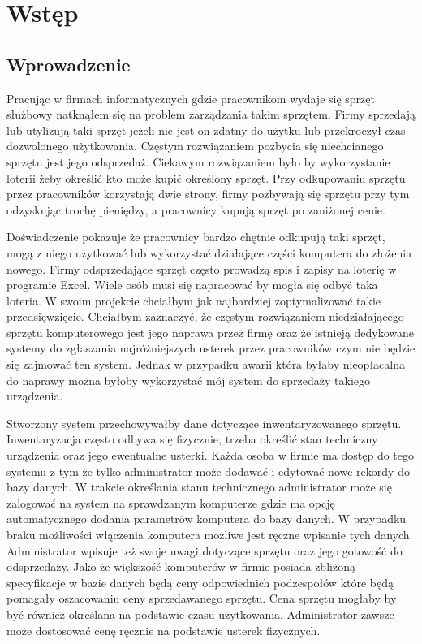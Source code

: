 \chapter{Wstęp}
\section{Wprowadzenie}

Pracując w firmach informatycznych gdzie pracownikom wydaje się sprzęt służbowy natknąłem się na problem zarządzania takim sprzętem. Firmy sprzedają lub utylizują taki sprzęt jeżeli nie jest on zdatny do użytku lub przekroczył czas dozwolonego użytkowania. Częstym rozwiązaniem pozbycia się niechcianego sprzętu jest jego odsprzedaż. Ciekawym rozwiązaniem było by wykorzystanie loterii żeby określić kto może kupić określony sprzęt. Przy odkupowaniu sprzętu przez pracowników korzystają dwie strony, firmy pozbywają się sprzętu przy tym odzyskując trochę pieniędzy, a pracownicy kupują sprzęt po zaniżonej cenie. 

Doświadczenie pokazuje że pracownicy bardzo chętnie odkupują taki sprzęt, mogą z niego użytkować lub wykorzystać działające części komputera do złożenia nowego. Firmy odsprzedające sprzęt często prowadzą spis i zapisy na loterię w programie Excel. Wiele osób musi się napracować by mogła się odbyć taka loteria. W swoim projekcie chciałbym jak najbardziej zoptymalizować takie przedsięwzięcie. Chciałbym zaznaczyć, że częstym rozwiązaniem niedziałającego sprzętu komputerowego jest jego naprawa przez firmę oraz że istnieją dedykowane systemy do zgłaszania najróżniejszych usterek przez pracowników czym nie będzie się zajmować ten system. Jednak w przypadku awarii która byłaby nieopłacalna do naprawy można byłoby wykorzystać mój system do sprzedaży takiego urządzenia.

Stworzony system przechowywałby dane dotyczące inwentaryzowanego sprzętu. Inwentaryzacja często odbywa się fizycznie, trzeba określić stan techniczny urządzenia oraz jego ewentualne usterki. Każda osoba w firmie ma dostęp do tego systemu z tym że tylko administrator może dodawać i edytować nowe rekordy do bazy danych. W trakcie określania stanu technicznego administrator może się zalogować na system na sprawdzanym komputerze gdzie ma opcję automatycznego dodania parametrów komputera do bazy danych. W przypadku braku możliwości włączenia komputera możliwe jest ręczne wpisanie tych danych. Administrator wpisuje też swoje uwagi dotyczące sprzętu oraz jego gotowość do odsprzedaży. Jako że większość komputerów w firmie posiada zbliżoną specyfikacje w bazie danych będą ceny odpowiednich podzespołów które będą pomagały oszacowaniu ceny sprzedawanego sprzętu. Cena sprzętu mogłaby by być również określana na podstawie czasu użytkowania. Administrator zawsze może dostosować cenę ręcznie na podstawie usterek fizycznych.

